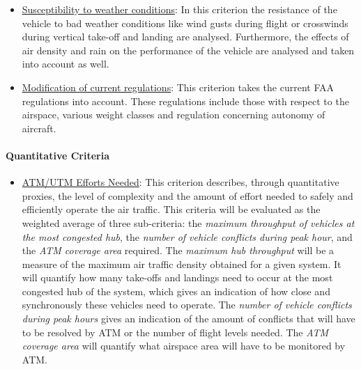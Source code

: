 \begin{itemize}[nolistsep]
    \item \underline{Susceptibility to weather conditions}: In this criterion the resistance of the vehicle to bad weather conditions like wind gusts during flight or crosswinds during vertical take-off and landing are analysed. Furthermore, the effects of air density and rain on the performance of the vehicle are analysed and taken into account as well. 
    \item \underline{Modification of current regulations}: This criterion takes the current FAA regulations into account. These regulations include those with respect to the airspace, various weight classes and regulation concerning autonomy of aircraft. 
  
\end{itemize}

\paragraph{Quantitative Criteria}
\begin{itemize}[nolistsep]
    \item \underline{ATM/UTM Efforts Needed}: This criterion describes, through quantitative proxies, the level of complexity and the amount of effort needed to safely and efficiently operate the air traffic. This criteria will be evaluated as the weighted average of three sub-criteria: the \textit{maximum throughput of vehicles at the most congested hub}, the \textit{number of vehicle conflicts during peak hour}, and the \textit{ATM coverage area} required. The \textit{maximum hub throughput} will be a measure of the maximum air traffic density obtained for a given system. It will quantify how many take-offs and landings need to occur at the most congested hub of the system, which gives an indication of how close and synchronously these vehicles need to operate. The \textit{number of vehicle conflicts during peak hours} gives an indication of the amount of conflicts that will have to be resolved by ATM or the number of flight levels needed. The \textit{ATM coverage area} will quantify what airspace area will have to be monitored by ATM.


    
\end{itemize}

